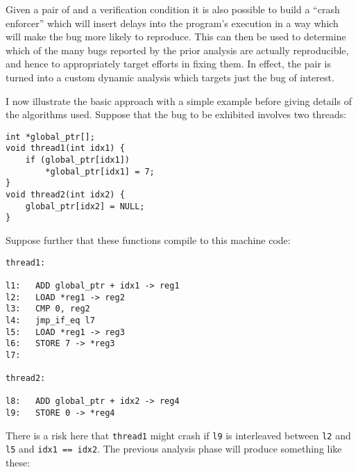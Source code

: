 

Given a pair of {\StateMachines} and a verification condition it is
also possible to build a ``crash enforcer'' which will insert delays
into the program's execution in a way which will make the bug more
likely to reproduce.  This can then be used to determine which of the
many bugs reported by the prior analysis are actually reproducible,
and hence to appropriately target efforts in fixing them.  In effect,
the {\StateMachine} pair is turned into a custom dynamic analysis
which targets just the bug of interest.

I now illustrate the basic approach with a simple example before
giving details of the algorithms used.  Suppose that the bug to be
exhibited involves two threads:

\begin{verbatim}
int *global_ptr[];
void thread1(int idx1) {
    if (global_ptr[idx1])
        *global_ptr[idx1] = 7;
} 
void thread2(int idx2) {
    global_ptr[idx2] = NULL;
}
\end{verbatim}

Suppose further that these functions compile to this machine code:

\begin{verbatim}
thread1:

l1:   ADD global_ptr + idx1 -> reg1
l2:   LOAD *reg1 -> reg2
l3:   CMP 0, reg2
l4:   jmp_if_eq l7
l5:   LOAD *reg1 -> reg3
l6:   STORE 7 -> *reg3
l7:

thread2:

l8:   ADD global_ptr + idx2 -> reg4
l9:   STORE 0 -> *reg4
\end{verbatim}

There is a risk here that \verb|thread1| might crash if \verb|l9| is
interleaved between \verb|l2| and \verb|l5| and \verb|idx1 == idx2|.
The previous analysis phase will produce \StateMachines something like
these:

